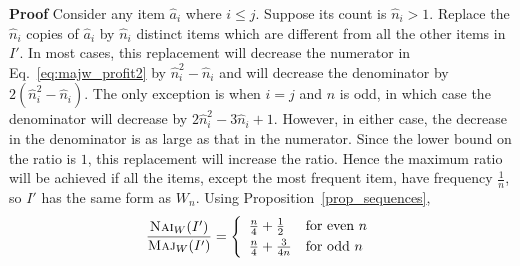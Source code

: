 \documentclass[11pt]{article}
\newenvironment{proof}{\begin{trivlist}\item[]{\bf Proof }}{\hspace*{\fill}\raisebox{-1pt}{\boldmath$\Box$}\end{trivlist}}
\newcommand{\maj}{{\ensuremath{\textsc{Maj}}}\xspace}
\newcommand{\nav}{{\ensuremath{\textsc{Nai}}}\xspace}
\begin{document}
\begin{proof}
Consider any item $\hat{a}_i$ where $i\leq j$. Suppose its count is $\hat{n}_i >1$.
Replace the $\hat{n}_i$ copies of $\hat{a}_i$ by $\hat{n}_i$  distinct items which are different from all the other items in $I'$.
In most cases, this replacement will decrease the numerator in Eq.~\ref{eq:majw_profit2} by $\hat{n}_i^2 - \hat{n}_i$ and will decrease the denominator by $2(\hat{n}_i^2 - \hat{n}_i)$.
The only exception is when $i=j$ and $n$ is odd, in which case the denominator will decrease by $2\hat{n}_i^2 - 3\hat{n}_i +1$.
However, in either case, the decrease in the denominator is as large as that in the numerator.
Since the lower bound on the ratio is $1$, this replacement will increase the ratio.
Hence the maximum ratio will be achieved if all the items, except the most frequent item, have frequency $\frac{1}{n}$, so  $I'$ has the same form as $W_n$. Using Proposition~\ref{prop_sequences},
\begin{equation}
\frac{\nav_W(I')}{\maj_W(I')} = \left\{ \begin{array}{ll}
\frac{n}{4} + \frac{1}{2} & \mbox{for even $n$}\vspace{1 mm}\\
\frac{n}{4} + \frac{3}{4n} & \mbox{for odd $n$}
\end{array} \right. \label{eq:majw_up}
\end{equation}



\end{proof}
\end{document}
